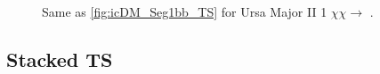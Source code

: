 \begin{figure}[t]
    \caption{Same as \cref{fig:icDM_Seg1bb_TS} for Ursa Major II 1 $\chi\chi \rightarrow$ \parpar{\nu_\mu}.}
    \label{fig:icDM_UMa2numu_TS}
\end{figure}


\subsection{Stacked TS} \label{sec:icDM_TSstacked}


